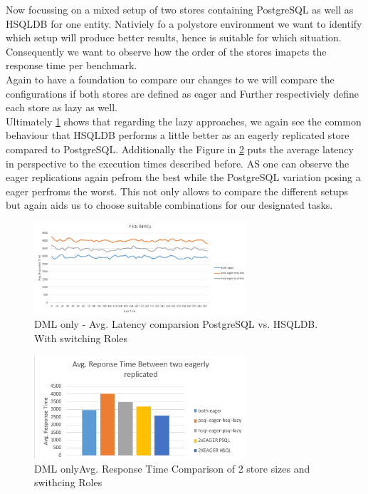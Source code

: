 Now focussing on a mixed setup of two stores containing PostgreSQL as well as HSQLDB for one entity.
Nativiely fo a polystore environment we want to identify which setup will produce better results, hence is suitable for which situation.
Consequently we want to observe how the order of the stores imapcts the response time per benchmark.\\
Again to have a foundation to compare our changes to we will compare the configurations if both stores are defined as eager and Further
respectiviely define each store as lazy as well.\\
Ultimately \ref{fig:psqlhsqlresponse} shows that regarding the lazy approaches, we again see the common behaviour that HSQLDB performs a little better as an eagerly replicated
store compared to PostgreSQL.
Additionally the Figure in \ref{fig:overall_comp} puts the average latency in perspective to the execution times described before.
AS one can observe the eager replications again pefrom the best while the PostgreSQL variation posing a eager perfroms the worst.
This not only allows to compare the different setups but again aids us to choose suitable combinations for our designated tasks.\\

\begin{figure}[t] 
    \centering 
    \includegraphics[width=0.7\textwidth]{Figures/PSQ_HSQL_DML_only.PNG}
    \caption{DML only - Avg. Latency comparsion PostgreSQL vs. HSQLDB. With switching Roles}
    \label{fig:psqlhsqlresponse}
\end{figure}

\begin{figure}[t] 
    \centering 
    \includegraphics[width=0.7\textwidth]{Figures/psq_hsql_avg.response2.PNG}
    \caption{DML onlyAvg. Response Time Comparison of 2 store sizes and swithcing Roles}
    \label{fig:overall_comp}
\end{figure}


